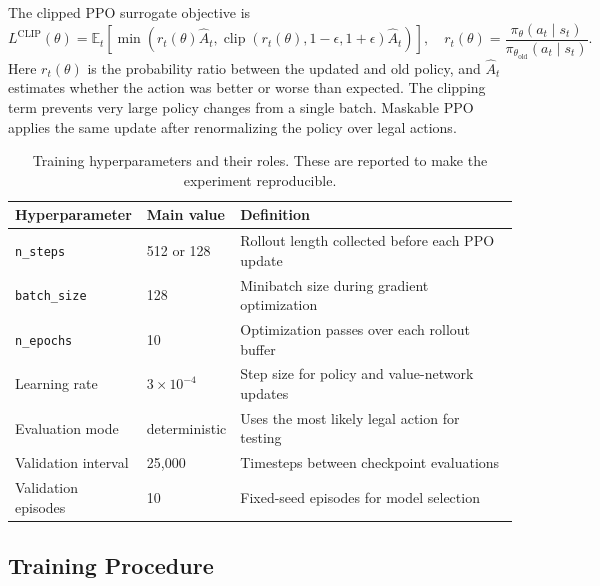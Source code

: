 \documentclass[10pt,a4paper]{article}
\begin{document}
The clipped PPO surrogate objective is
\[
L^{\mathrm{CLIP}}(\theta)=
\mathbb{E}_t\left[
\min\left(
r_t(\theta)\hat{A}_t,
\operatorname{clip}(r_t(\theta),1-\epsilon,1+\epsilon)\hat{A}_t
\right)
\right],
\quad
r_t(\theta)=\frac{\pi_\theta(a_t\mid s_t)}
{\pi_{\theta_{\mathrm{old}}}(a_t\mid s_t)}.
\]
Here \(r_t(\theta)\) is the probability ratio between the updated and old policy, and \(\hat{A}_t\) estimates whether the action was better or worse than expected. The clipping term prevents very large policy changes from a single batch. Maskable PPO applies the same update after renormalizing the policy over legal actions.

\begin{table}[H]
\centering
\caption{Training hyperparameters and their roles. These are reported to make the experiment reproducible.}
\label{tab:hyperparameter-definitions}
\small
\begin{tabular}{lll}
\toprule
Hyperparameter & Main value & Definition \\
\midrule
\texttt{n\_steps} & 512 or 128 & Rollout length collected before each PPO update \\
\texttt{batch\_size} & 128 & Minibatch size during gradient optimization \\
\texttt{n\_epochs} & 10 & Optimization passes over each rollout buffer \\
Learning rate & \(3\times10^{-4}\) & Step size for policy and value-network updates \\
Evaluation mode & deterministic & Uses the most likely legal action for testing \\
Validation interval & 25,000 & Timesteps between checkpoint evaluations \\
Validation episodes & 10 & Fixed-seed episodes for model selection \\
\bottomrule
\end{tabular}
\end{table}

\subsection{Training Procedure}
\end{document}
